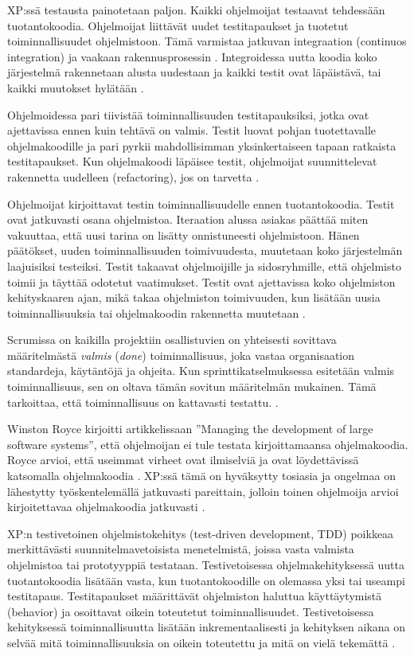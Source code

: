 \documentclass[finnish]{tktltiki2}
\theoremstyle{definition}
\theoremstyle{remark}
\begin{document}
XP:ssä testausta painotetaan paljon. Kaikki ohjelmoijat testaavat tehdessään tuotantokoodia. Ohjelmoijat liittävät uudet testitapaukset ja tuotetut toiminnallisuudet ohjelmistoon. Tämä varmistaa jatkuvan integraation (continuos integration) ja vaakaan rakennusprosessin \cite{FOW01a}. Integroidessa uutta koodia koko järjestelmä rakennetaan alusta uudestaan ja kaikki testit ovat läpäistävä, tai kaikki muutokset hylätään \cite{BEC99}.

Ohjelmoidessa pari tiivistää toiminnallisuuden testitapauksiksi, jotka ovat ajettavissa ennen kuin tehtävä on valmis. Testit luovat pohjan tuotettavalle ohjelmakoodille ja pari pyrkii mahdollisimman yksinkertaiseen tapaan ratkaista testitapaukset. Kun ohjelmakoodi läpäisee testit, ohjelmoijat suunnittelevat rakennetta uudelleen (refactoring), jos on tarvetta \cite{BEC99}.

Ohjelmoijat kirjoittavat testin toiminnallisuudelle ennen tuotantokoodia. Testit ovat jatkuvasti osana ohjelmistoa. Iteraation alussa asiakas päättää miten vakuuttaa, että uusi tarina on lisätty onnistuneesti ohjelmistoon. Hänen päätökset, uuden toiminnallisuuden toimivuudesta, muutetaan koko järjestelmän laajuisiksi testeiksi. Testit takaavat ohjelmoijille ja sidosryhmille, että ohjelmisto toimii ja täyttää odotetut vaatimukset. Testit ovat ajettavissa koko ohjelmiston kehityskaaren ajan, mikä takaa ohjelmiston toimivuuden, kun lisätään uusia toiminnallisuuksia tai ohjelmakoodin rakennetta muutetaan \cite{BEC99}.

Scrumissa on kaikilla projektiin osallistuvien on yhteisesti sovittava määritelmästä \textit{valmis} (\textit{done}) toiminnallisuus, joka vastaa organisaation standardeja, käytäntöjä ja ohjeita. Kun sprinttikatselmuksessa esitetään valmis toiminnallisuus, sen on oltava tämän sovitun määritelmän mukainen. Tämä tarkoittaa, että toiminnallisuus on kattavasti testattu. \cite{SCH09}.

Winston Royce kirjoitti artikkelissaan ''Managing the development of large software systems'', että ohjelmoijan ei tule testata kirjoittamaansa ohjelmakoodia. Royce arvioi, että useimmat virheet ovat ilmiselviä ja ovat löydettävissä katsomalla ohjelmakoodia \cite{ROY70}. XP:ssä tämä on hyväksytty tosiasia ja ongelmaa on lähestytty työskentelemällä jatkuvasti pareittain, jolloin toinen ohjelmoija arvioi kirjoitettavaa ohjelmakoodia jatkuvasti \cite{BEC99}.

XP:n testivetoinen ohjelmistokehitys (test-driven development, TDD) poikkeaa merkittävästi suunnitelmavetoisista menetelmistä, joissa vasta valmista ohjelmistoa tai prototyyppiä testataan. Testivetoisessa ohjelmakehityksessä uutta tuotantokoodia lisätään vasta, kun tuotantokoodille on olemassa yksi tai useampi testitapaus. Testitapaukset määrittävät ohjelmiston haluttua käyttäytymistä (behavior) ja osoittavat oikein toteutetut toiminnallisuudet. Testivetoisessa kehityksessä toiminnallisuutta lisätään inkrementaalisesti ja kehityksen aikana on selvää mitä toiminnallisuuksia on oikein toteutettu ja mitä on vielä tekemättä \cite{EDW03}. 
\end{document}
